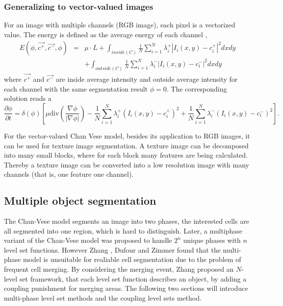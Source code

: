 \subsubsection{Generalizing to vector-valued images}
For an image with multiple channels (RGB image), each pixel is a vectorized value. The energy is defined as the average energy of each channel \cite{chan2000active},
\begin{eqnarray}
\nonumber
E(\phi,\vec{c^+}, \vec{c^-},\phi) & = &\mu\cdot L + \int_{inside( C)} \frac{1}{N}\sum_{i=1}^N\lambda_i^+|I_i(x,y)-c_i^+|^2dxdy \\
& & + \int_{outside(C )}\frac{1}{N}\sum_{i=1}^N\lambda_i^-|I_i(x,y)-c_i^-|^2dxdy
\end{eqnarray}
where $\vec{c^+}$ and $\vec{c^-}$ are inside average intensity and outside average intensity for each channel with the same segmentation result $\phi = 0$. The corresponding solution reads a
\begin{equation}
\frac{\partial \phi}{\partial t} = \delta(\phi)\left[\mu\mbox{div}\left(\frac{\nabla\phi}{|\nabla\phi|}\right) -\frac{1}{N}\sum_{i=1}^N\lambda_i^+(I_i(x,y)-c_i^+)^2 + \frac{1}{N}\sum_{i=1}^N\lambda_i^-(I_i(x,y)-c_i^-)^2\right].
\end{equation}

For the vector-valued Chan Vese model, besides its application to RGB images, it can be used for texture image segmentation. A texture image can be decomposed into many small blocks, where for each block many features are being calculated. Thereby a texture image can be converted into a low resolution image with many channels (that is, one feature one channel).

\subsection{Multiple object segmentation}
The Chan-Vese model segments an image into two phases, the interested cells are all segmented into one region, which is hard to distinguish. Later, a multiphase variant of the Chan-Vese model was proposed to handle $2^n$ unique phases with $n$ level set functions. However Zhang \cite{zhang2004tracking}, Dufour \cite{dufour2005segmenting} and Zimmer \cite{zimmer2005coupled} found that the multi-phase model is unsuitable for realiable cell segmentation due to the problem of frequent cell merging. By considering the merging event, Zhang \cite{zhang2004tracking} proposed an $N$-level set framework, that each level set function describes an object, by adding a coupling punishment for merging areas. The following two sections will introduce multi-phase level set methods and the coupling level sets method.

